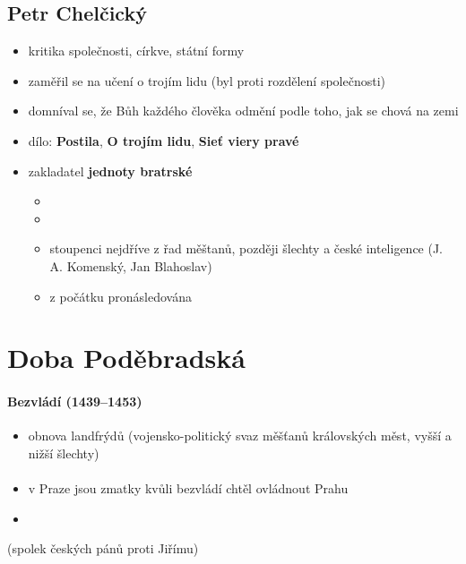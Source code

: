 \subsection{Petr Chelčický}
\begin{itemize}
\item kritika společnosti, církve, státní formy
\item zaměřil se na učení o trojím lidu (byl proti rozdělení společnosti)
\item domníval se, že Bůh každého člověka odmění podle toho, jak se chová na zemi
\item dílo: \textbf{Postila}, \textbf{O trojím lidu}, \textbf{Sieť viery pravé}
\item zakladatel \textbf{jednoty bratrské}
	\begin{itemize}
	\item {}
	\item {}
	\item stoupenci nejdříve z řad měštanů, později šlechty a české inteligence (J. A. Komenský, Jan Blahoslav)
	\item z počátku pronásledována
	\end{itemize}
\end{itemize}



\section{Doba Poděbradská}
\paragraph{Bezvládí (1439--1453)} 
\begin{itemize}
\item obnova landfrýdů (vojensko-politický svaz měšťanů královských měst, vyšší a nižší šlechty)
\end{itemize}

\paragraph{}
\begin{itemize}
\item v Praze jsou zmatky kvůli bezvládí \ra chtěl ovládnout Prahu
\item {}
\end{itemize}
\mbox{}
 (spolek českých pánů proti Jiřímu)

